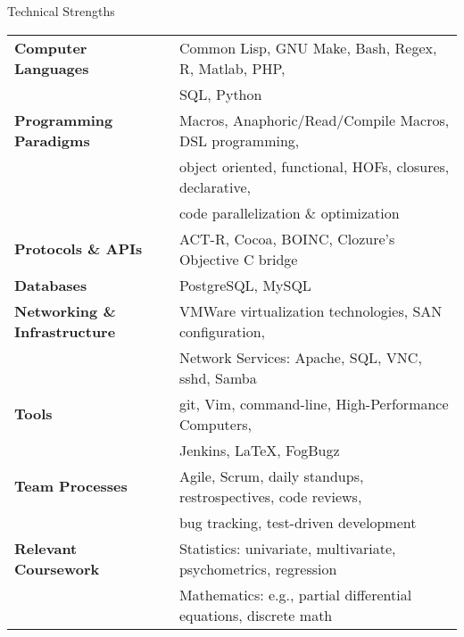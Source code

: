

\begin{rSection}{Technical Strengths}

\begin{tabular}{ @{} >{\bfseries}l @{\hspace{6ex}} l }
Computer Languages & 		Common Lisp, GNU Make, Bash, Regex, R, Matlab, PHP, \\
& 				SQL, Python \\
Programming Paradigms &		Macros, Anaphoric/Read/Compile Macros, DSL programming, \\
& 				object oriented, functional, HOFs, closures, declarative, \\
&				code parallelization \& optimization \\
Protocols \& APIs & 		ACT-R, Cocoa, BOINC, Clozure's Objective C bridge \\
Databases &			PostgreSQL, MySQL \\
Networking \& Infrastructure &	VMWare virtualization technologies, SAN configuration, \\
&				Network Services: Apache, SQL, VNC, sshd, Samba \\
Tools & 			git, Vim, command-line, High-Performance Computers, \\
&				Jenkins, \LaTeX, FogBugz \\
Team Processes & 		Agile, Scrum, daily standups, restrospectives, code reviews, \\
& 				bug tracking, test-driven development \\
Relevant Coursework &		Statistics: univariate, multivariate, psychometrics, regression \\
&				Mathematics: e.g., partial differential equations, discrete math
\end{tabular}

\end{rSection}


